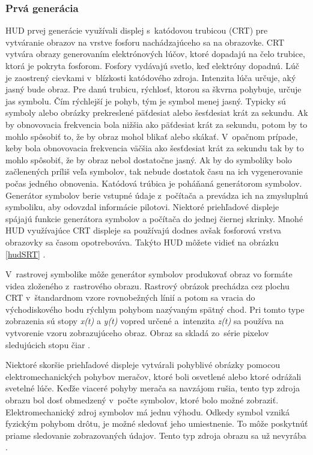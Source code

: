 \subsubsection{Prvá generácia}
HUD prvej generácie využívali displej s~katódovou trubicou (CRT) pre vytváranie obrazov na vrstve fosforu nachádzajúceho sa na obrazovke. CRT vytvára obrazy generovaním elektrónových lúčov, ktoré dopadajú na čelo trubice, ktorá je pokryta fosforom. Fosfory vydávajú svetlo, keď elektróny dopadnú. Lúč je zaostrený cievkami v~blízkosti katódového zdroja. Intenzita lúča určuje, aký jasný bude obraz. Pre danú trubicu, rýchlosť, ktorou sa škvrna pohybuje, určuje jas symbolu. Čím rýchlejší je pohyb, tým je symbol menej jasný. Typicky sú symboly alebo obrázky prekreslené päťdesiat alebo šesťdesiat krát za sekundu. Ak by obnovovacia frekvencia bola nižšia ako päťdesiat krát za sekundu, potom by to mohlo spôsobiť to, že by obraz mohol blikať alebo skákať. V~opačnom prípade, keby bola obnovovacia frekvencia väčšia ako šesťdesiat krát za sekundu tak by to mohlo spôsobiť, že by obraz nebol dostatočne jasný. Ak by do symboliky bolo začlenených príliš veľa symbolov, tak nebude dostatok času na ich vygenerovanie počas jedného obnovenia. Katódová trúbica je poháňaná generátorom symbolov. Generátor symbolov berie vstupné údaje z~počítača a prevádza ich na zmysluplnú symboliku, aby odovzdal informácie pilotovi. Niektoré priehľadové displeje spájajú funkcie generátora symbolov a počítača do jednej čiernej skrinky. Mnohé HUD využívajúce CRT displeje sa používajú dodnes avšak fosforová vrstva obrazovky sa časom opotrebováva. Takýto HUD môžete vidieť na obrázku \ref{hudSRT} \cite{HUDkniha}.

V~rastrovej symbolike môže generátor symbolov produkovať obraz vo formáte videa zloženého z~rastrového obrazu. Rastrový obrázok prechádza cez plochu CRT v~štandardnom vzore rovnobežných línií a potom sa vracia do východiskového bodu rýchlym pohybom nazývaným spätný chod. Pri tomto type zobrazenia sú stopy \textit{x(t)} a \textit{y(t)} vopred určené a~intenzita \textit{z(t)} sa používa na vytvorenie vzoru zobrazujúceho obraz. Obraz sa skladá zo~série pixelov sledujúcich stopu čiar \cite{HUDkniha}.

Niektoré skoršie priehľadové displeje vytvárali pohyblivé obrázky pomocou elektromechanických pohybov meračov, ktoré boli osvetlené alebo ktoré odrážali svetelné lúče. Keďže viaceré pohyby merača sa navzájom rušia, tento typ zdroja obrazu bol dosť obmedzený v~počte symbolov, ktoré bolo možné zobraziť. Elektromechanický zdroj symbolov má jednu výhodu. Odkedy symbol vzniká fyzickým pohybom drôtu, je možné sledovať jeho umiestnenie. To môže poskytnúť priame sledovanie zobrazovaných údajov. Tento typ zdroja obrazu sa už nevyrába \cite{HUDkniha}.

